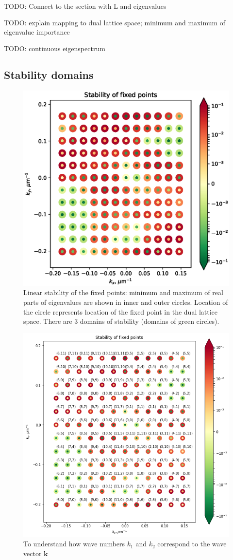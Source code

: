 \documentclass[a4paper,12pt]{article}
\renewcommand*{\vec}[1]{\mathbf{#1}}
\begin{document}
TODO: Connect to the section with L and eigenvalues

TODO: explain mapping to dual lattice space; minimum and maximum of eigenvalue importance

TODO: continuous eigenspectrum

\subsection{Stability domains}

\begin{figure}[h]
    \centering
    \includegraphics[width=.6\textwidth]{assets/theory-2019-09-05-124002319-236.eps}
    \caption{Linear stability of the fixed points: minimum and maximum of real parts of eigenvalues are shown in inner and outer circles. Location of the circle represents location of the fixed point in the dual lattice space. There are 3 domains of stability (domains of green circles).}
\end{figure}

\begin{figure}[h]
    \centering
    \includegraphics[width=.6\textwidth]{assets/m-twist-map.png}
    \caption{To understand how wave numbers $k_1$ and $k_2$ correspond to the wave vector $\vec{k}$}
\end{figure}
\end{document}
